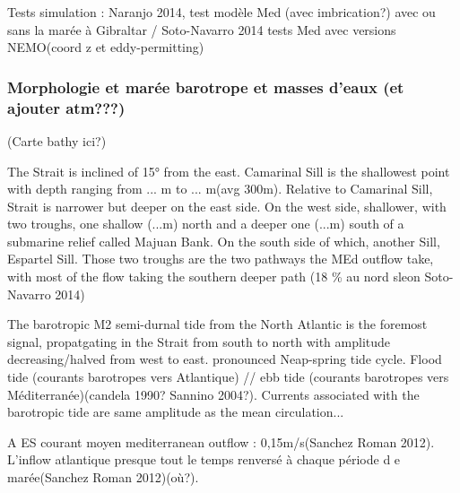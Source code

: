 Tests simulation : Naranjo 2014, test modèle Med (avec imbrication?) avec ou sans la marée à Gibraltar / Soto-Navarro 2014 tests Med avec versions NEMO(coord z et eddy-permitting)



\subsubsection{Morphologie et marée barotrope et masses d'eaux (et ajouter atm???)}

(Carte bathy ici?)

The Strait is inclined of 15° from the east. Camarinal Sill is the shallowest point with depth ranging from ... m to ... m(avg 300m). Relative to Camarinal Sill, Strait is narrower but deeper on the east side. On the west side, shallower, with two troughs, one shallow (...m) north and a deeper one (...m) south of a submarine relief called Majuan Bank. On the south side of which, another Sill, Espartel Sill. Those two troughs are the two pathways the MEd outflow take, with most of the flow taking the southern deeper path (18 \% au nord sleon Soto-Navarro 2014)



The barotropic M2 semi-durnal tide from the North Atlantic is the foremost signal, propatgating in the Strait from south to north with amplitude decreasing/halved from west to east\citep{candela_1990}. pronounced Neap-spring tide cycle.  Flood tide (courants barotropes vers Atlantique) // ebb tide (courants barotropes vers Méditerranée)(candela 1990? Sannino 2004?). Currents associated with the barotropic tide are same amplitude as the mean circulation...


A ES courant moyen mediterranean outflow : 0,15m/s(Sanchez Roman 2012). L’inflow atlantique presque tout le temps renversé à chaque période d e marée(Sanchez Roman 2012)(où?).




